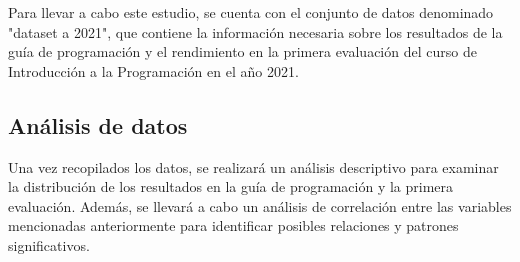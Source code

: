 Para llevar a cabo este estudio, se cuenta con el conjunto de datos denominado "dataset a 2021", que contiene la información necesaria sobre los
resultados de la guía de programación y el rendimiento en la primera evaluación del curso de Introducción a la Programación en el año 2021.


\subsection{Análisis de datos}

Una vez recopilados los datos, se realizará un análisis descriptivo para examinar la distribución de los resultados en la guía de programación y
la primera evaluación. Además, se llevará a cabo un análisis de correlación entre las variables mencionadas anteriormente para identificar posibles
relaciones y patrones significativos.
